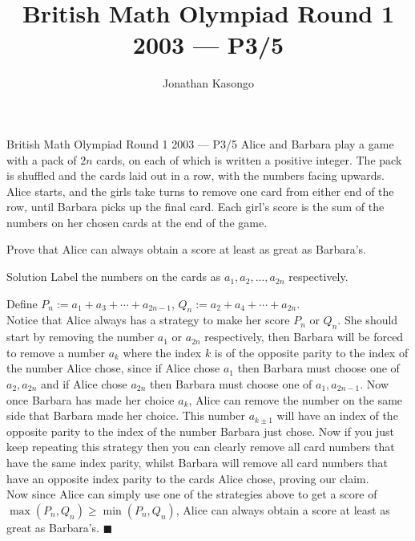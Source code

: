 \documentclass{article}
\author{Jonathan Kasongo}
\title{British Math Olympiad Round 1 2003 --- P3/5}
\begin{document}
\maketitle

\begin{problem}{British Math Olympiad Round 1 2003 --- P3/5}
Alice and Barbara play a game with a pack of $2n$ cards, on each of
which is written a positive integer. The pack is shuffled and the cards
laid out in a row, with the numbers facing upwards. Alice starts, and
the girls take turns to remove one card from either end of the row,
until Barbara picks up the final card. Each girl’s score is the sum of
the numbers on her chosen cards at the end of the game.

Prove that Alice can always obtain a score at least as great as
Barbara’s.
\end{problem}

\begin{solution}{Solution}
Label the numbers on the cards as $a_1, a_2, ..., a_{2n}$ respectively.

Define $P_{n} := a_1 + a_3 + \cdots + a_{2n-1}$,
$Q_n := a_2 + a_4 + \cdots + a_{2n}$. \\

Notice that Alice always has a strategy to make her score
$P_n$ or $Q_n$. She should start by removing the number $a_1$ or $a_{2n}$
respectively, then Barbara will be forced to remove a number $a_k$ where
the index $k$ is of the opposite parity to the index of the number Alice
chose, since if Alice chose $a_1$ then Barbara must choose one of
$a_2, a_{2n}$ and if Alice chose $a_{2n}$ then Barbara must choose one of
$a_1, a_{2n-1}$. Now once Barbara has made her choice $a_k$, Alice can
remove the number
on the same side that Barbara made her choice. This number $a_{k \pm 1}$
will have an index of the opposite parity to the index of the number
Barbara just chose. Now if you just keep repeating this strategy then you
can clearly remove all card numbers that have the same index parity, whilst
Barbara will remove all card numbers that have an opposite index parity to
the cards Alice chose,
proving our claim.\\

Now since Alice can simply use one of the strategies above to get a score
of $\max(P_n, Q_n) \geq \min(P_n, Q_n)$,
Alice can always obtain a score at least as great as
Barbara’s. $\blacksquare$
\end{solution}
\end{document}
